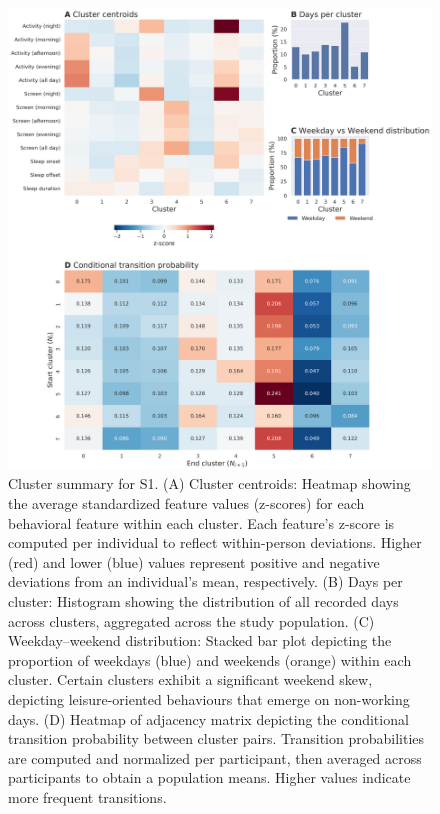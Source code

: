 \documentclass[pdflatex,sn-vancouver,Numbered]{bst/sn-jnl}%
\theoremstyle{thmstyleone}%
\theoremstyle{thmstyletwo}%
\theoremstyle{thmstylethree}%
\begin{document}
\begin{figure}[htbp!]
    \centering
    \includegraphics[width=1\linewidth]{figures/tesserae_summary.png}
    \caption{Cluster summary for S1. (A) Cluster centroids: Heatmap showing the average standardized feature values (z-scores) for each behavioral feature within each cluster. Each feature’s z-score is computed per individual to reflect within-person deviations. Higher (red) and lower (blue) values represent positive and negative deviations from an individual’s mean, respectively. (B) Days per cluster: Histogram showing the distribution of all recorded days across clusters, aggregated across the study population. (C) Weekday–weekend distribution: Stacked bar plot depicting the proportion of weekdays (blue) and weekends (orange) within each cluster. Certain clusters exhibit a significant weekend skew, depicting leisure-oriented behaviours that emerge on non-working days. (D) Heatmap of adjacency matrix depicting the conditional transition probability between cluster pairs. Transition probabilities are computed and normalized per participant, then averaged across participants to obtain a population means. Higher values indicate more frequent transitions.}
    \label{fig:tesserae-cluster-summary}
\end{figure}
\end{document}
